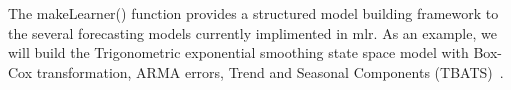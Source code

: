\documentclass{article}\usepackage[]{graphicx}\usepackage[]{color}
\makeatletter
\theoremstyle{definition}
\newcommand\code{\@codex}
\def\@codex#1{{\normalfont\ttfamily\hyphenchar\font=-1 #1}}
\newcommand{\pkg}[1]{{\fontseries{b}\selectfont #1}}
\makeatother
\begin{document}
The \code{makeLearner()} function provides a structured model building framework to the several forecasting models currently implimented in \pkg{mlr}. As an example, we will build the Trigonometric exponential smoothing state space model with Box-Cox transformation, ARMA errors, Trend and Seasonal Components (TBATS)~\cite{tbats}.

\end{document}
